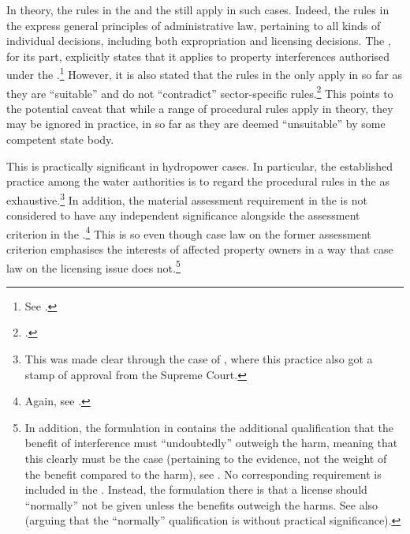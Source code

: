 In theory, the rules in the \cite{ea59} and the \cite{paa67} still apply in such cases. Indeed, the rules in the \cite{paa67} express general principles of administrative law, pertaining to all kinds of individual decisions, including both expropriation and  licensing decisions. The \cite{ea59}, for its part, explicitly states that it applies to property interferences authorised under the \cite{wra17}.\footnote{See \cite[30]{ea59}.} However, it is also stated that the rules in the \cite{ea59} only apply in so far as they are ``suitable'' and do not ``contradict'' sector-specific rules.\footcite[30]{ea59} This points to the potential caveat that while a range of procedural rules apply in theory, they may be ignored in practice, in so far as they are deemed ``unsuitable'' by some competent state body.

This is practically significant in hydropower cases. In particular, the established practice among the water authorities is to regard the procedural rules in the \cite{wra17} as exhaustive.\footnote{This was made clear through the case of \cite{jorpeland11}, where this practice also got a stamp of approval from the Supreme Court.} In addition, the material assessment requirement in the \cite{ea59} is not considered to have any independent significance alongside the assessment criterion in the \cite{wra17}.\footnote{Again, see \cite{jorpeland11}.} This is so even though case law on the former assessment criterion emphasises the interests of affected property owners in a way that case law on the licensing issue does not.\footnote{In addition, the formulation in \cite[2]{ea59} contains the additional qualification that the benefit of interference must ``undoubtedly'' outweigh the harm, meaning that this clearly must be the case (pertaining to the evidence, not the weight of the benefit compared to the harm), see \cite{lovenskiold09}. No corresponding requirement is included in the \cite[8]{wra17}. Instead, the formulation there is that a license should ``normally'' not be given unless the benefits outweigh the harms. See also \cite[325-236]{haagensen02} (arguing that the ``normally'' qualification is without practical significance).}


